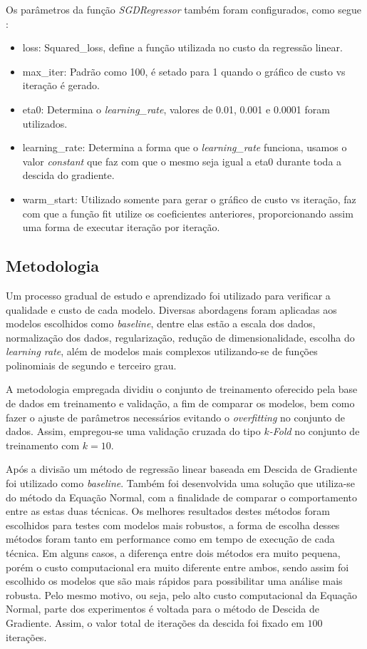 \documentclass[conference]{IEEEtran}
\begin{document}
Os parâmetros da função \emph{SGDRegressor} também foram configurados, como segue :
\begin{itemize}
	\item loss: Squared\_loss, define a função utilizada no custo da regressão linear.
	\item max\_iter: Padrão como 100, é setado para 1 quando o gráfico de custo vs iteração é gerado.
	\item eta0: Determina o \emph{learning\_rate}, valores de 0.01, 0.001 e 0.0001 foram utilizados.
	\item learning\_rate: Determina a forma que o \emph{learning\_rate} funciona, usamos o valor \emph{constant} que faz com que o mesmo seja igual a eta0 durante toda a descida do gradiente.
	\item warm\_start: Utilizado somente para gerar o gráfico de custo vs iteração, faz com que a função fit utilize os coeficientes anteriores, proporcionando assim uma forma de executar iteração por iteração.
\end{itemize}

\subsection{Metodologia} \label{sec:metodologia}

Um processo gradual de estudo e aprendizado foi utilizado para verificar a qualidade e custo de cada modelo.  Diversas abordagens foram aplicadas aos modelos escolhidos como \textit{baseline}, dentre elas estão a escala dos dados, normalização dos dados, regularização, redução de dimensionalidade, escolha do \emph{learning rate}, além de modelos mais complexos utilizando-se de funções polinomiais de segundo e terceiro grau. 

A metodologia empregada dividiu o conjunto de treinamento oferecido pela base de dados em treinamento e validação, a fim de comparar os modelos, bem como fazer o ajuste de parâmetros necessários evitando o \textit{overfitting} no conjunto de dados. Assim, empregou-se uma validação cruzada do tipo \textit{$k$-Fold} no conjunto de treinamento com $k=10$.

Após a divisão um método de regressão linear baseada em Descida de Gradiente foi utilizado como \emph{baseline}. Também foi desenvolvida uma solução que utiliza-se do método da Equação Normal, com a finalidade de comparar o comportamento entre as estas duas técnicas.  Os melhores resultados destes métodos foram escolhidos para testes com modelos mais robustos, a forma de escolha desses métodos foram tanto em performance como em tempo de execução de cada técnica. Em alguns casos, a diferença entre dois métodos era muito pequena, porém o custo computacional era muito diferente entre ambos, sendo assim foi escolhido os modelos que são mais rápidos para possibilitar uma análise mais robusta. Pelo mesmo motivo, ou seja, pelo alto custo computacional da Equação Normal, parte dos experimentos é voltada para o método de Descida de Gradiente. Assim, o valor total de iterações da descida foi fixado em $100$ iterações.
\end{document}
